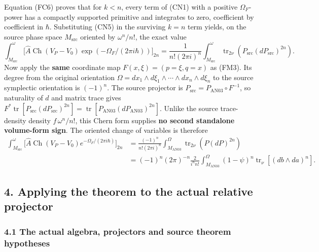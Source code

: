 \documentclass[
  11pt,
]{article}
\begin{document}
Equation (FC6) proves that for \(k<n\), every term of (CN1) with a
positive \(\Omega_F\)-power has a compactly supported primitive and
integrates to zero, coefficient by coefficient in \(\hbar\).
Substituting (CN5) in the surviving \(k=n\) term yields, on the source
phase space \(M_{\mathrm{src}}\) oriented by \(\omega^n/n!\), the exact
value \[
 \int_{M_{\mathrm{src}}}^{\omega}
   \bigl[\hat A\operatorname{Ch}(V_P-V_0)
       \exp(-\Omega_F/(2\pi i\hbar))\bigr]_{2n}
  =\frac{1}{n!(2\pi i)^n}
     \int_{M_{\mathrm{src}}}^{\omega}
        \operatorname{tr}_{2\nu}\!\left(P_{\mathrm{src}}(dP_{\mathrm{src}})^{2n}\right).
 \tag{CN6}
\] Now apply the \textbf{same} coordinate map \(F(x,\xi)=(p=\xi,q=x)\)
as (FM3). Its degree from the original orientation
\(\Omega=dx_1\wedge d\xi_1\wedge\cdots\wedge dx_n\wedge d\xi_n\) to the
source symplectic orientation is \((-1)^n\). The source projector is
\(P_{\mathrm{src}}=P_{\mathrm{AN03}}\circ F^{-1}\), so naturality of
\(d\) and matrix trace gives
\(F^*\operatorname{tr}[P_{\mathrm{src}}(dP_{\mathrm{src}})^{2n}]=\operatorname{tr}[P_{\mathrm{AN03}}(dP_{\mathrm{AN03}})^{2n}]\).
Unlike the source trace-density density \(f\,\omega^n/n!\), this Chern
form supplies \textbf{no second standalone volume-form sign}. The
oriented change of variables is therefore \[
 \begin{aligned}
 \int_{M_{\mathrm{src}}}^{\omega}
   \bigl[\hat A\operatorname{Ch}(V_P-V_0)
         e^{-\Omega_F/(2\pi i\hbar)}\bigr]_{2n}
 &=\frac{(-1)^n}{n!(2\pi i)^n}
     \int_{M_{\mathrm{AN03}}}^{\Omega}
        \operatorname{tr}_{2\nu}\!\left(P(dP)^{2n}\right)\\
 &=(-1)^n(2\pi)^{-n}\frac{2}{i^n n!}
     \int_{M_{\mathrm{AN03}}}^{\Omega}
       (1-\psi)^n\operatorname{tr}_\nu[(db\wedge da)^n].
 \end{aligned}
 \tag{CN7}
\]

\subsection{4. Applying the theorem to the actual relative
projector}\label{applying-the-theorem-to-the-actual-relative-projector}

\subsubsection{4.1 The actual algebra, projectors and source theorem
hypotheses}\label{the-actual-algebra-projectors-and-source-theorem-hypotheses}
\end{document}
